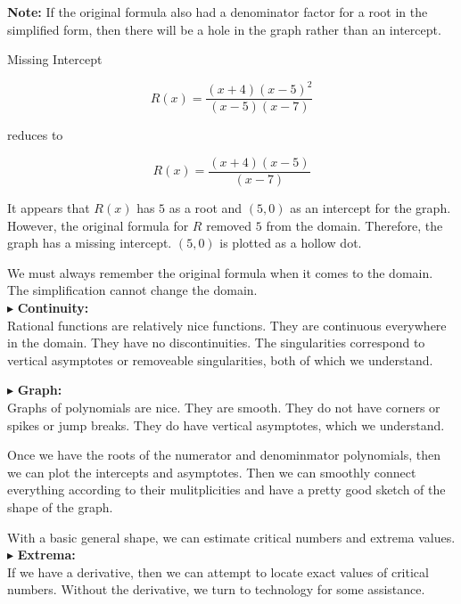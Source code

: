 \documentclass{ximera}
\begin{document}
\textbf{Note:} If the original formula also had a denominator factor for a root in the simplified form, then there will be a hole in the graph rather than an intercept. 



\begin{example}  Missing Intercept

\[     R(x) = \frac{(x+4)(x-5)^2}{(x-5)(x-7)}     \]

reduces to 

\[     R(x) = \frac{(x+4)(x-5)}{(x-7)}     \]


It appears that $R(x)$ has $5$ as a root and $(5,0)$ as an intercept for the graph.  However, the original formula for $R$ removed $5$ from the domain.  Therefore, the graph has a missing intercept. $(5,0)$ is plotted as a hollow dot.






\end{example}

We must always remember the original formula when it comes to the domain.  The simplification cannot change the domain. \\





$\blacktriangleright$ \textbf{\textcolor{red!10!blue!90!}{Continuity:}} \\
Rational functions are relatively nice functions.  They are continuous everywhere in the domain.  They have no discontinuities.  The singularities correspond to vertical asymptotes or removeable singularities, both of which we understand.



$\blacktriangleright$ \textbf{\textcolor{red!10!blue!90!}{Graph:}} \\
Graphs of polynomials are nice.  They are smooth.  They do not have corners or spikes or jump breaks. They do have vertical asymptotes, which we understand.


Once we have the roots of the numerator and denominmator polynomials, then we can plot the intercepts and asymptotes.  Then we can smoothly connect everything according to their mulitplicities and have a pretty good sketch of the shape of the graph.

With a basic general shape, we can estimate critical numbers and extrema values. \\




$\blacktriangleright$ \textbf{\textcolor{red!10!blue!90!}{Extrema:}} \\
If we have a derivative, then we can attempt to locate exact values of critical numbers.  Without the derivative, we turn to technology for some assistance.
\end{document}
